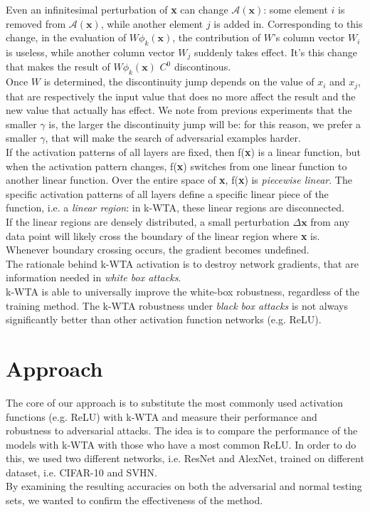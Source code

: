 \documentclass[a4paper]{article}
\begin{document}
	Even an infinitesimal perturbation of \textbf{x} can change $\mathcal{A}(\textbf{x})$: some element $i$ is removed from $\mathcal{A}(\textbf{x})$, while another element $j$ is added in. Corresponding to this change, in the evaluation of $W\phi_{k}(\textbf{x})$, the contribution of $W$'s column vector $W_{i}$ is useless, while another column vector $W_{j}$ suddenly takes effect. It's this change that makes the result of $W\phi_{k}(\textbf{x})$ $C^0$ discontinous.\\
	Once $W$ is determined, the discontinuity jump depends on the value of $x_i$ and $x_j$, that are respectively the input value that does no more affect the result and the new value that actually has effect. We note from previous experiments that the smaller $\gamma$ is, the larger the discontinuity jump will be: for this reason, we prefer a smaller $\gamma$, that will make the search of adversarial examples harder.\\
	If the activation patterns of all layers are fixed, then f(\textbf{x}) is a linear function, but when the activation pattern changes, f(\textbf{x}) switches from one linear function to another linear function. Over the entire space of \textbf{x}, f(\textbf{x}) is \emph{piecewise linear}. The specific activation patterns of all layers define a specific linear piece of the function, i.e. a \emph{linear region}: in k-WTA, these linear regions are disconnected.\\
	If the linear regions are densely distributed, a small perturbation $\Delta\textbf{x}$ from any data point will likely cross the boundary of the linear region where \textbf{x} is. Whenever boundary crossing occurs, the gradient becomes undefined.\\
	The rationale behind k-WTA activation is to destroy network gradients, that are information needed in \emph{white box attacks}.\\
	k-WTA is able to universally improve the white-box robustness, regardless of the training method. The k-WTA robustness under \emph{black box attacks} is not always significantly better than other activation function networks (e.g. ReLU).
	
	\section{Approach}
	The core of our approach is to substitute the most commonly used activation functions (e.g. ReLU) with k-WTA and measure their performance and robustness to adversarial attacks.
	The idea is to compare the performance of the models with k-WTA with those who have a most common ReLU.
	In order to do this, we used two different networks, i.e. ResNet and AlexNet, trained on different dataset, i.e. CIFAR-10 and SVHN.\\
	By examining the resulting accuracies on both the adversarial and normal testing sets, we wanted to confirm the effectiveness of the method.
	
\end{document}
